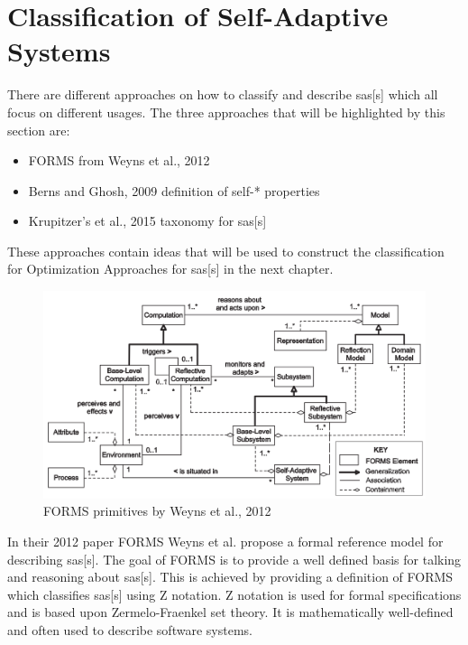 \section{Classification of Self-Adaptive Systems}
\label{ch:SASClassification}

There are different approaches on how to classify and describe \acrlong{sas}[s] which all focus on different usages.
The three approaches that will be highlighted by this section are:
\begin{itemize}[nosep]
    \item FORMS from Weyns et al., 2012 \cite*{FORMS}
    \item Berns and Ghosh, 2009 definition of self-* properties \cite*{DissectingSelfProperties}
    \item Krupitzer's et al., 2015 taxonomy for \acrlong{sas}[s] \cite*{SurveyOnEngineeringApproaches}
\end{itemize} 
These approaches contain ideas that will be used to construct the classification for
Optimization Approaches for \acrlong{sas}[s] in the next chapter.

\begin{figure}[b!]
    \centering
    \includegraphics[width=\textwidth]{images/FORMS.png}
    \caption{FORMS primitives by Weyns et al., 2012 \cite*{FORMS}}
    \label{fig:FORMS}
\end{figure}
\noindent In their 2012 paper FORMS \cite{FORMS} Weyns et al. propose a formal reference model for describing \acrlong{sas}[s].
The goal of FORMS is to provide a well defined basis for talking and reasoning about \acrlong{sas}[s].
This is achieved by providing a definition of FORMS which classifies \acrlong{sas}[s] using Z notation.
Z notation is used for formal specifications and is based upon Zermelo-Fraenkel set theory.
It is mathematically well-defined and often used to describe software systems.

